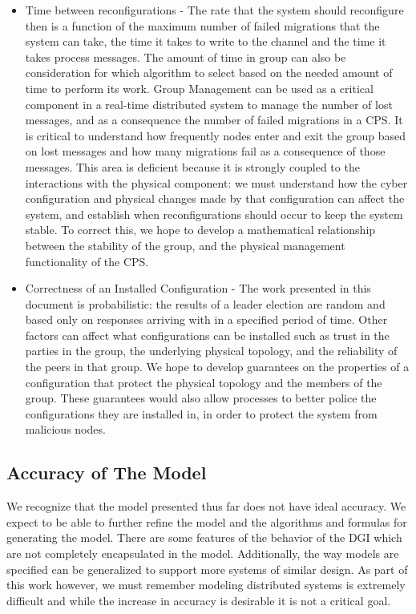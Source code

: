 \begin{itemize}
\item Time between reconfigurations - The rate that the system should reconfigure then is a function of the maximum number of failed migrations that the system can take, the time it takes to write to the channel and the time it takes process messages. The amount of time in group can also be consideration for which algorithm to select based on the needed amount of time to perform its work. Group Management can be used as a critical component in a real-time distributed system to manage the number of lost messages, and as a consequence the number of failed migrations in a CPS. It is critical to understand how frequently nodes enter and exit the group based on lost messages and how many migrations fail as a consequence of those messages. This area is deficient because it is strongly coupled to the interactions with the physical component: we must understand how the cyber configuration and physical changes made by that configuration can affect the system, and establish when reconfigurations should occur to keep the system stable. To correct this, we hope to develop a mathematical relationship between the stability of the group, and the physical management functionality of the CPS.

\item Correctness of an Installed Configuration - The work presented in this document is probabilistic: the results of a leader election are random and based only on responses arriving with in a specified period of time. Other factors can affect what configurations can be installed such as trust in the parties in the group, the underlying physical topology, and the reliability of the peers in that group. We hope to develop guarantees on the properties of a configuration that protect the physical topology and the members of the group. These guarantees would also allow processes to better police the configurations they are installed in, in order to protect the system from malicious nodes.
\end{itemize}

\subsection{Accuracy of The Model}

We recognize that the model presented thus far does not have ideal accuracy. We expect to be able to further refine the model and the algorithms and formulas for generating the model. There are some features of the behavior of the DGI which are not completely encapsulated in the model. Additionally, the way models are specified can be generalized to support more systems of similar design. As part of this work however, we must remember modeling distributed systems is extremely difficult and while the increase in accuracy is desirable it is not a critical goal.

